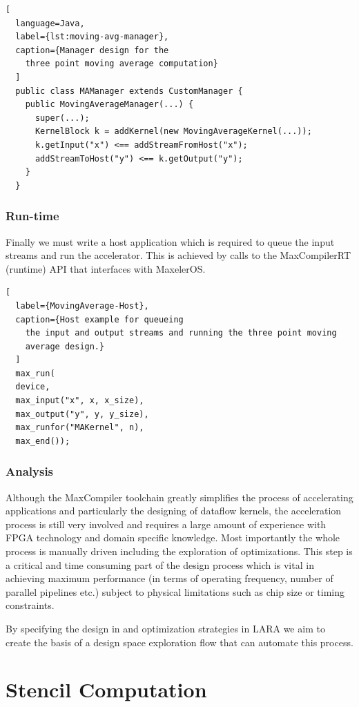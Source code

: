 \begin{lstlisting}[
  language=Java,
  label={lst:moving-avg-manager},
  caption={Manager design for the
    three point moving average computation}
  ]
  public class MAManager extends CustomManager {
    public MovingAverageManager(...) {
      super(...);
      KernelBlock k = addKernel(new MovingAverageKernel(...));
      k.getInput("x") <== addStreamFromHost("x");
      addStreamToHost("y") <== k.getOutput("y");
    }
  }
\end{lstlisting}

\subsubsection{Run-time}
Finally we must write a host application which is required to queue
the input streams and run the accelerator. This is achieved by calls
to the MaxCompilerRT (runtime) API that interfaces with MaxelerOS.

\begin{lstlisting}[
  label={MovingAverage-Host},
  caption={Host example for queueing
    the input and output streams and running the three point moving
    average design.}
  ]
  max_run(
  device,
  max_input("x", x, x_size),
  max_output("y", y, y_size),
  max_runfor("MAKernel", n),
  max_end());
\end{lstlisting}

\subsubsection{Analysis}
Although the MaxCompiler toolchain greatly simplifies the process of
accelerating applications and particularly the designing of dataflow
kernels, the acceleration process is still very involved and requires
a large amount of experience with FPGA technology and domain specific
knowledge. Most importantly the whole process is manually driven
including the exploration of optimizations. This step is a critical
and time consuming part of the design process which is vital in
achieving maximum performance (in terms of operating frequency, number
of parallel pipelines etc.) subject to physical limitations such as
chip size or timing constraints.

By specifying the design in \FAST{} and optimization strategies in LARA
we aim to create the basis of a design space exploration flow that can
automate this process.

\section{Stencil Computation}


